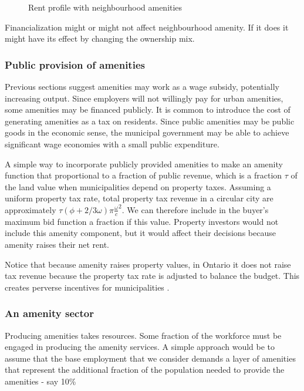 \begin{figure}[tb]
\begin{center}

\end{center}
\caption{Rent profile with neighbourhood amenities}
\label{fig-amenity2}
\end{figure}
Financialization might or might not affect neighbourhood amenity. If it does it might have its effect by changing the ownership mix.

\subsubsection{Public provision of amenities}

Previous sections suggest amenities may work as a wage subsidy, potentially increasing output. Since employers will not willingly pay for urban amenities, some amenities may be financed publicly. It is common to introduce the cost of generating amenities as a tax on residents.  Since public amenities may be \glspl{public good} in the economic sense, the municipal government may be able to achieve significant wage economies with a small public expenditure.

A simple way to incorporate publicly provided amenities to make an amenity function that proportional to a fraction of public revenue, which is a fraction $\tau$ of the land value when municipalities depend on property taxes. Assuming a uniform property tax rate, total property tax revenue in a circular city are approximately $\tau(\phi+2/3 \omega)\pi \frac{\omega}{c}^2$. We can therefore include in the buyer's maximum bid function a fraction if this value. Property investors would not include this amenity component, but it would affect their decisions because amenity raises their net rent.

Notice that because amenity raises property values, in Ontario it does not raise tax revenue because the property tax rate is adjusted to balance the budget. This creates perverse incentives for municipalities \cite{blaisPerverseCitiesHidden2011}.


\subsubsection{An amenity sector}
Producing amenities takes resources. Some fraction of the workforce must be engaged in producing the amenity services. A simple approach would be to assume that the base employment that we consider demands a layer of amenities that represent the additional fraction of the population needed to provide the amenities - say 10\%  

